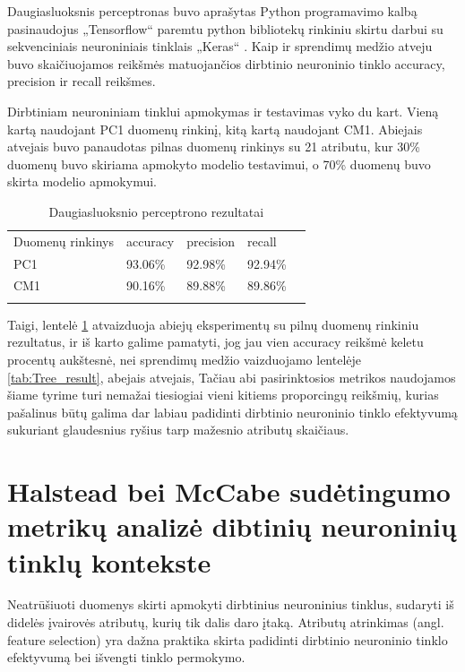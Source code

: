 \documentclass{VUMIFPSbakalaurinis}
\begin{document}
Daugiasluoksnis perceptronas buvo aprašytas Python programavimo kalbą pasinaudojus „Tensorflow“ paremtu python bibliotekų rinkiniu skirtu darbui su sekvenciniais neuroniniais tinklais „Keras“ \cite{chollet2015keras}. Kaip ir sprendimų medžio atveju buvo skaičiuojamos reikšmės matuojančios dirbtinio neuroninio tinklo accuracy, precision ir recall reikšmes.

Dirbtiniam neuroniniam tinklui apmokymas ir testavimas vyko du kart. Vieną kartą naudojant PC1 duomenų rinkinį, kitą kartą naudojant CM1. Abiejais atvejais buvo panaudotas pilnas duomenų rinkinys su 21 atributu, kur 30\% duomenų buvo skiriama apmokyto modelio testavimui, o 70\% duomenų buvo skirta modelio apmokymui.

\begin{table}[H]\footnotesize
\centering
\caption{Daugiasluoksnio perceptrono rezultatai}
\label{tab:MLP_result}
\begin{tabular}{lllll}
\cline{1-4}
\multicolumn{1}{|l}{Duomenų rinkinys} & accuracy & precision & \multicolumn{1}{l|}{recall} &  \\ \cline{1-4}
\multicolumn{1}{|l}{PC1}              & 93.06\%   & 92.98\%     & \multicolumn{1}{l|}{92.94\%} &  \\
\multicolumn{1}{|l}{CM1}              & 90.16\%    & 89.88\%     & \multicolumn{1}{l|}{89.86\%}  &  \\ \cline{1-4}
                                      &          &           &                             & 
\end{tabular}
\end{table}

Taigi, lentelė \ref{tab:MLP_result} atvaizduoja abiejų eksperimentų su pilnų duomenų rinkiniu rezultatus, ir iš karto galime pamatyti, jog jau vien accuracy reikšmė keletu procentų aukštesnė, nei sprendimų medžio vaizduojamo lentelėje \ref{tab:Tree_result}, abejais atvejais, Tačiau abi pasirinktosios metrikos naudojamos šiame tyrime turi nemažai tiesiogiai vieni kitiems proporcingų reikšmių, kurias pašalinus būtų galima dar labiau padidinti dirbtinio neuroninio tinklo efektyvumą sukuriant glaudesnius ryšius tarp mažesnio atributų skaičiaus.

\section{Halstead bei McCabe sudėtingumo metrikų analizė dibtinių neuroninių tinklų kontekste}

Neatrūšiuoti duomenys skirti apmokyti dirbtinius neuroninius tinklus, sudaryti iš didelės įvairovės atributų, kurių tik dalis daro įtaką. Atributų atrinkimas (angl. feature selection) yra dažna praktika skirta padidinti dirbtinio neuroninio tinklo efektyvumą bei išvengti tinklo permokymo.
\end{document}
